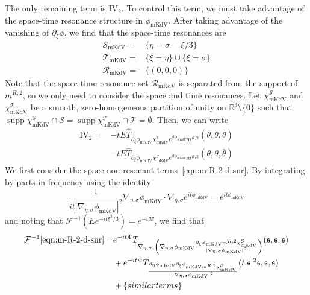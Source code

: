 \documentclass[letterpaper, reqno,final]{amsart}
\DeclareMathOperator{\supp}{supp}
\newcommand{\bbR}{\mathbb{R}}
\newcommand{\fs}{\mathfrak{s}}
\newcommand{\rmIV}{\mathrm{IV}}
\newcommand{\discrAvg}{\Psi}
\newcommand{\invLinProp}[1][t]{e^{-i#1\discrAvg}}
\newcommand{\deles}{\nabla_{\eta,\sigma}}
\newcommand{\tmkdv}{\text{mKdV}}
\newcommand{\btext}[1]{\left\{\textup{#1}\right\}}
\newcommand{\bsim}{\btext{similar terms}}
\begin{document}
The only remaining term is $\rmIV_2$.  To control this term, we must take advantage of the space-time resonance structure in $\phi_{\tmkdv}$.  After taking advantage of the vanishing of $\partial_\xi \phi$, we find that the space-time resonances are
\begin{equation}\label{eqn:mKdV-str-def}\begin{split}
    \mathcal{S}_{\tmkdv} =& \{\eta = \sigma = \xi/3\}\\
    \mathcal{T}_{\tmkdv} =& \{\xi = \eta\} \cup \{\xi = \sigma\}\\
    \mathcal{R}_{\tmkdv} =& \{(0,0,0)\}
\end{split}\end{equation}
Note that the space-time resonance set $\mathcal{R}_\tmkdv$ is separated from the support of $m^{R,2}$, so we only need to consider the space and time resonances.  Let $\chi^\mathcal{S}_{\tmkdv}$ and $\chi^\mathcal{T}_{\tmkdv}$ be a smooth, zero-homogeneous partition of unity on $\bbR^3 \setminus \{0\}$ such that $\supp \chi^\mathcal{S}_{\tmkdv} \cap \mathcal{S} = \supp \chi^\mathcal{T}_{\tmkdv} \cap \mathcal{T} = \emptyset$.  Then, we can write
\begin{subequations}\begin{align}
    \rmIV_2 =& -t E \hat{T}_{\partial_\xi \phi_{\tmkdv} \chi^\mathcal{S}_{\tmkdv} e^{it\phi_{mKdV}} m^{R,2}}(\theta, \theta, \overline{\theta})\label{eqn:m-R-2-d-snr}\\
    &- t E \hat{T}_{\partial_\xi \phi_{\tmkdv} \chi^\mathcal{T}_{\tmkdv} e^{it\phi_{mKdV}} m^{R,2}}(\theta, \theta, \overline{\theta})\label{eqn:m-R-2-d-tnr}
\end{align}\end{subequations}
We first consider the space non-resonant terms~\eqref{eqn:m-R-2-d-snr}.  By integrating by parts in frequency using the identity
\begin{equation*}
    \frac{1}{it|\deles \phi_{\tmkdv}|^2}\deles \phi_{\tmkdv} \cdot \deles e^{it\phi_{\tmkdv}} = e^{it\phi_{\tmkdv}}
\end{equation*}
and noting that $\mathcal{F}^{-1}(Ee^{-it\xi^3/3}) = \invLinProp $, we find that
\begin{subequations}\begin{align}
    \mathcal{F}^{-1} \eqref{eqn:m-R-2-d-snr} =& \invLinProp  T_{\deles \cdot \left(\deles \phi_{\tmkdv} \frac{\partial_\xi \phi_\tmkdv m^{R,2} \chi^\mathcal{S}_\tmkdv}{|\deles \phi_{\tmkdv}|^2}\right)}(\fs, \fs, \fs)\label{eqn:m-R-2-d-snr-symb-deriv}\\
    &+ \invLinProp  T_{\frac{\partial_{\eta}\phi_\tmkdv \partial_\xi \phi_{\tmkdv m^{R,2} \chi^\mathcal{S}_{\tmkdv}}}{|\deles \phi_\tmkdv|^2}}(t|\fs|^2\fs, \fs, \fs)\label{eqn:m-R-2-d-snr-arg-deriv-1}\\
    &+ \bsim\notag
\end{align}\end{subequations}
\end{document}
